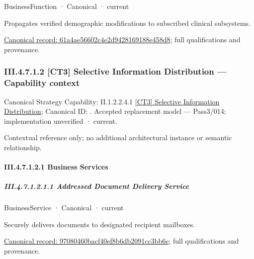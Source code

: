 \label{element:61a4ae56602c4e2d9428169188e458d8}
{\small BusinessFunction · Canonical · current}\par

Propagates verified demographic modifications to subscribed clinical subsystems.


{\footnotesize \href{../../../../../../../../continuum/business/business-function/61a4ae56602c4e2d9428169188e458d8.md}{Canonical record: 61a4ae56602c4e2d9428169188e458d8}; full qualifications and provenance.}\par
\subsubsection*{III.4.7.1.2 [CT3] Selective Information Distribution — Capability context}
\label{navigation:III.4.7.1.2}

{\small Canonical Strategy Capability: II.1.2.2.4.1 \hyperref[element:87869a1eec5f4c7cb87600a06cc8fd6e]{[CT3] Selective Information Distribution}; Canonical ID: \texttt{}. Accepted replacement model — Pass3/014; implementation unverified · current.}\par
Contextual reference only; no additional architectural instance or semantic relationship.\par
\paragraph*{III.4.7.1.2.1 Business Services}
\label{navigation:III.4.7.1.2.1}

\subparagraph*{III.4.7.1.2.1.1 Addressed Document Delivery Service}
\label{navigation:III.4.7.1.2.1.1}

\label{element:97080460bacf40ef8b6db2091cc3bb6e}
{\small BusinessService · Canonical · current}\par

Securely delivers documents to designated recipient mailboxes.


{\footnotesize \href{../../../../../../../../continuum/business/business-service/97080460bacf40ef8b6db2091cc3bb6e.md}{Canonical record: 97080460bacf40ef8b6db2091cc3bb6e}; full qualifications and provenance.}\par
